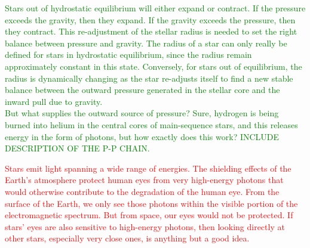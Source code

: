 \documentclass[main.tex]{subfiles}
\begin{document}
\begin{tcolorbox}[sharp corners, colback=green!30, colframe=green!80!blue, title=What determines the radius of a star?$^{9}$]
\par \textcolor{green} {Stars out of hydrostatic equilibrium will either expand or contract.  If the pressure exceeds the gravity, then they expand.  If the gravity exceeds the pressure, then they contract.  This re-adjustment of the stellar radius is needed to set the right balance between pressure and gravity.  The radius of a star can only really be defined for stars in hydrostatic equilibrium, since the radius remain approximately constant in this state.  Conversely, for stars out of equilibrium, the radius is dynamically changing as the star re-adjusts itself to find a new stable balance between the outward pressure generated in the stellar core and the inward pull due to gravity. \\
But what supplies the outward source of pressure?  Sure, hydrogen is being burned into helium in the central cores of main-sequence stars, and this releases energy in the form of photons, but how exactly does this work?  INCLUDE DESCRIPTION OF THE P-P CHAIN.}
\end{tcolorbox}

\begin{tcolorbox}[sharp corners, colback=red!30, colframe=red!80!blue, title=Stellar Emission$^{10}$]
\par \textcolor{red} {Stars emit light spanning a wide range of energies.  The shielding effects of the Earth's atmosphere protect human eyes from very high-energy photons that would otherwise contribute to the degradation of the human eye.  From the surface of the Earth, we only see those photons within the visible portion of the electromagnetic spectrum.  But from space, our eyes would not be protected.  If stars' eyes are also sensitive to high-energy photons, then looking directly at other stars, especially very close ones, is anything but a good idea.}
\end{tcolorbox}
\end{document}
